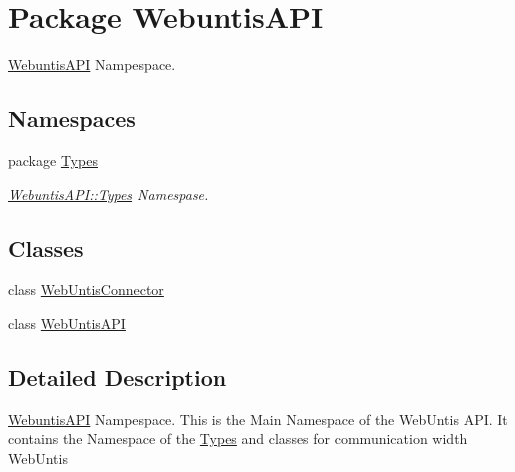 \hypertarget{namespace_webuntis_a_p_i}{\section{Package Webuntis\-A\-P\-I}
\label{namespace_webuntis_a_p_i}
}


\hyperlink{namespace_webuntis_a_p_i}{Webuntis\-A\-P\-I} Nampespace.  


\subsection*{Namespaces}
\begin{DoxyCompactItemize}
\item 
package \hyperlink{namespace_webuntis_a_p_i_1_1_types}{Types}
\begin{DoxyCompactList}\small\item\em \hyperlink{namespace_webuntis_a_p_i_1_1_types}{Webuntis\-A\-P\-I\-::\-Types} Namespase. \end{DoxyCompactList}\end{DoxyCompactItemize}
\subsection*{Classes}
\begin{DoxyCompactItemize}
\item 
class \hyperlink{class_webuntis_a_p_i_1_1_web_untis_connector}{Web\-Untis\-Connector}
\item 
class \hyperlink{class_webuntis_a_p_i_1_1_web_untis_a_p_i}{Web\-Untis\-A\-P\-I}
\end{DoxyCompactItemize}


\subsection{Detailed Description}
\hyperlink{namespace_webuntis_a_p_i}{Webuntis\-A\-P\-I} Nampespace. This is the Main Namespace of the Web\-Untis A\-P\-I. It contains the Namespace of the \hyperlink{namespace_webuntis_a_p_i_1_1_types}{Types} and classes for communication width Web\-Untis 